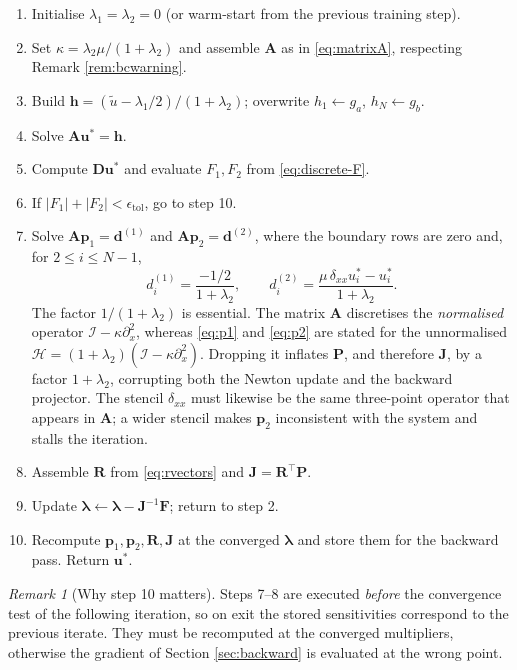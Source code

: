 \documentclass[11pt,a4paper]{article}
\theoremstyle{remark}
\newtheorem{remark}{Remark}
\newcommand{\ut}{\tilde{u}}
\newcommand{\us}{u^{*}}
\begin{document}
\begin{enumerate}[label=\textbf{\arabic*.}, leftmargin=2.2em]
\item Initialise $\lambda_1 = \lambda_2 = 0$ (or warm-start from the previous
      training step).
\item Set $\kappa = \lambda_2\mu/(1+\lambda_2)$ and assemble $\bm{A}$ as in
      \eqref{eq:matrixA}, respecting Remark \ref{rem:bcwarning}.
\item Build $\bm{h} = (\ut - \lambda_1/2)/(1+\lambda_2)$; overwrite
      $h_1 \leftarrow g_a$, $h_N \leftarrow g_b$.
\item Solve $\bm{A}\bm{\us} = \bm{h}$.
\item Compute $\bm{D}\bm{\us}$ and evaluate $F_1, F_2$ from \eqref{eq:discrete-F}.
\item If $|F_1| + |F_2| < \epsilon_{\text{tol}}$, go to step 10.
\item Solve $\bm{A}\bm{p}_1 = \bm{d}^{(1)}$ and
      $\bm{A}\bm{p}_2 = \bm{d}^{(2)}$, where the boundary rows are zero and,
      for $2\le i\le N-1$,
      \begin{equation}
      d^{(1)}_i = \frac{-1/2}{1+\lambda_2},
      \qquad
      d^{(2)}_i = \frac{\mu\,\delta_{xx}\us_i - \us_i}{1+\lambda_2} .
      \end{equation}
      The factor $1/(1+\lambda_2)$ is essential. The matrix $\bm{A}$
      discretises the \emph{normalised} operator
      $\mathcal{I}-\kappa\partial_x^2$, whereas \eqref{eq:p1} and
      \eqref{eq:p2} are stated for the unnormalised
      $\mathcal{H} = (1+\lambda_2)(\mathcal{I}-\kappa\partial_x^2)$. Dropping
      it inflates $\bm{P}$, and therefore $\bm{J}$, by a factor $1+\lambda_2$,
      corrupting both the Newton update and the backward projector. The
      stencil $\delta_{xx}$ must likewise be the same three-point operator
      that appears in $\bm{A}$; a wider stencil makes $\bm p_2$ inconsistent
      with the system and stalls the iteration.
\item Assemble $\bm{R}$ from \eqref{eq:rvectors} and $\bm{J} = \bm{R}^\top\bm{P}$.
\item Update $\bm\lambda \leftarrow \bm\lambda - \bm{J}^{-1}\bm{F}$; return to step 2.
\item Recompute $\bm{p}_1,\bm{p}_2,\bm{R},\bm{J}$ at the converged $\bm\lambda$
      and store them for the backward pass. Return $\bm{\us}$.
\end{enumerate}

\begin{remark}[Why step 10 matters]
Steps 7--8 are executed \emph{before} the convergence test of the following
iteration, so on exit the stored sensitivities correspond to the previous
iterate. They must be recomputed at the converged multipliers, otherwise the
gradient of Section \ref{sec:backward} is evaluated at the wrong point.
\end{remark}
\end{document}

